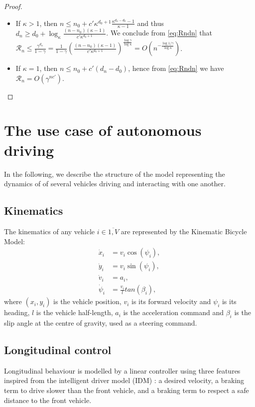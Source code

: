 \documentclass{article}
\begin{document}
\begin{proof}
	\begin{itemize}
		\item If $\kappa > 1$, then $n \leq n_0 + c'\kappa^{d_0+1}\frac{\kappa^{d_n-d_0}-1}{\kappa-1}$ and thus $d_n \geq d_0 + \log_\kappa \frac{(n-n_0)(\kappa - 1)}{c'\kappa^{d_0+1}}$.
		We conclude from \eqref{eq:Rndn} that $\mathcal{R}_n \leq \frac{\gamma^{d_n}}{1-\gamma} = \frac{1}{1-\gamma} \left( \frac{(n-n_0)(\kappa - 1)}{c'\kappa^{d_0+1}} \right)^\frac{\log \gamma}{\log \kappa} = O\left(n^{-\frac{\log 1/\gamma}{\log \kappa}}\right)$.
		
		\item If $\kappa = 1$, then $n \leq n_0 + c'(d_n-d_0)$, hence from \eqref{eq:Rndn} we have $\mathcal{R}_n = O\left(\gamma^{nc'}\right)$.
	\end{itemize}
\end{proof}


\section{The use case of autonomous driving}

In the following, we describe the structure of the model representing the dynamics of of several vehicles driving and interacting with one another.

\subsection{Kinematics}

The kinematics of any vehicle $i\in\overline{1,V}$ are represented by the Kinematic Bicycle Model:
\begin{align}
	\dot{x}_i &= v_i\cos(\psi_i), \nonumber\\
	\dot{y}_i &= v_i\sin(\psi_i), \nonumber\\
	\dot{v}_i &= a_i, \nonumber\\
	\dot{\psi}_i &= \frac{v_i}{l}tan(\beta_i), \nonumber
\end{align}
where $(x_i, y_i)$ is the vehicle position, $v_i$ is its forward velocity and $\psi_i$ is its heading, $l$ is the vehicle half-length, $a_i$ is the acceleration command and $\beta_i$ is the slip angle at the centre of gravity, used as a steering command.

\subsection{Longitudinal control}
Longitudinal behaviour is modelled by a linear controller using three features inspired from the intelligent driver model (IDM) \cite{Treiber2000}: a desired velocity, a braking term to drive slower than the front vehicle, and a braking term to respect a safe distance to the front vehicle.
\end{document}

